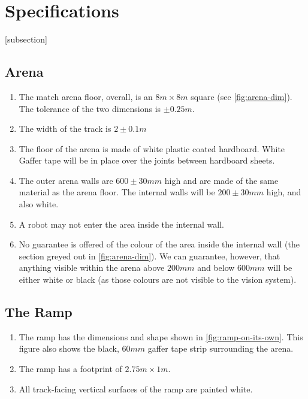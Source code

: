 \section{Specifications}
\label{sec:Specifications}

[subsection]
\newcommand{\rcnii}{\stepcounter{rulei}\arabic{section}.\arabic{subsection}.\arabic{rulei}}
\renewcommand{\labelenumi}{\rcnii}

\subsection{Arena}
\label{sub:arena}
\begin{enumerate}
\item The match arena floor, overall, is an $8m \times 8m$ square (see \autoref{fig:arena-dim}).
 The tolerance of the two dimensions is $\pm0.25m$.
\item The width of the track is $2\pm0.1m$
\item The floor of the arena is made of white plastic coated hardboard.
 White Gaffer tape will be in place over the joints between hardboard sheets.
\item The outer arena walls are $600\pm30mm$ high and are made of the same material as the arena floor.
 The internal walls will be $200\pm30mm$ high, and also white.
\item A robot may not enter the area inside the internal wall.
\item No guarantee is offered of the colour of the area inside the internal wall (the section greyed out in \autoref{fig:arena-dim}).
 We can guarantee, however, that anything visible within the arena above $200mm$ and below $600mm$ will be either white or black (as those colours are not visible to the vision system).
\end{enumerate}

\subsection{The Ramp}
\label{sub:Ramp}
\begin {enumerate}
\item The ramp has the dimensions and shape shown in \autoref{fig:ramp-on-its-own}.
 This figure also shows the black, $60mm$ gaffer tape strip surrounding the arena.
\item The ramp has a footprint of $2.75m \times 1m$.
\item All track-facing vertical surfaces of the ramp are painted white.
\end {enumerate}

